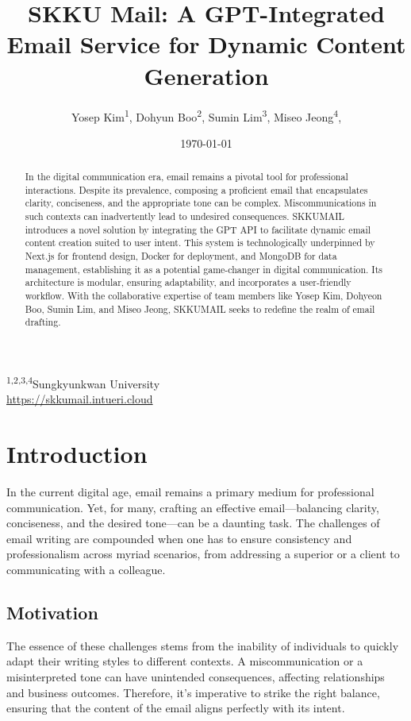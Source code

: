 \documentclass[12pt]{article}
\title{SKKU Mail: A GPT-Integrated Email Service for Dynamic Content Generation}
\author{
    Yosep Kim\textsuperscript{1}, 
    Dohyun Boo\textsuperscript{2}, 
    Sumin Lim\textsuperscript{3}, 
    Miseo Jeong\textsuperscript{4}, 
}
\date{\today}
\begin{document}
\maketitle

\begin{center}
	\textsuperscript{1,2,3,4}Sungkyunkwan University\\
	\href{https://skkumail.intueri.cloud}{https://skkumail.intueri.cloud}
\end{center}
\begin{abstract}
	In the digital communication era, email remains a pivotal tool for professional interactions. Despite its prevalence, composing a proficient email that encapsulates clarity, conciseness, and the appropriate tone can be complex. Miscommunications in such contexts can inadvertently lead to undesired consequences. SKKUMAIL introduces a novel solution by integrating the GPT API to facilitate dynamic email content creation suited to user intent. This system is technologically underpinned by Next.js for frontend design, Docker for deployment, and MongoDB for data management, establishing it as a potential game-changer in digital communication. Its architecture is modular, ensuring adaptability, and incorporates a user-friendly workflow. With the collaborative expertise of team members like Yosep Kim, Dohyeon Boo, Sumin Lim, and Miseo Jeong, SKKUMAIL seeks to redefine the realm of email drafting.
\end{abstract}
\section{Introduction}

In the current digital age, email remains a primary medium for professional communication. Yet, for many, crafting an effective email—balancing clarity, conciseness, and the desired tone—can be a daunting task. The challenges of email writing are compounded when one has to ensure consistency and professionalism across myriad scenarios, from addressing a superior or a client to communicating with a colleague. 

\subsection{Motivation}

The essence of these challenges stems from the inability of individuals to quickly adapt their writing styles to different contexts. A miscommunication or a misinterpreted tone can have unintended consequences, affecting relationships and business outcomes. Therefore, it's imperative to strike the right balance, ensuring that the content of the email aligns perfectly with its intent.
\end{document}
